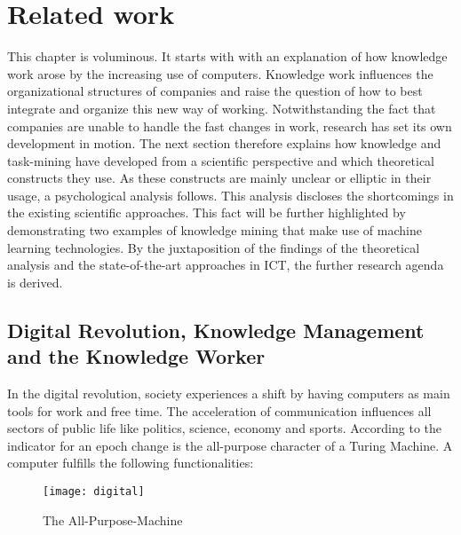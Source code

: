 
\chapter{Related work}
\label{relatedwork}
This chapter is voluminous. It starts with with an explanation of how knowledge work arose by the increasing use of computers. Knowledge work influences the organizational structures of companies and raise the question of how to best integrate and organize this new way of working. Notwithstanding the fact that companies are unable to handle the fast changes in work, research has set its own development in motion. The next section therefore explains how knowledge and task-mining have developed from a scientific perspective and which theoretical constructs they use. As these constructs are mainly unclear or elliptic in their usage, a psychological analysis follows. This analysis discloses the shortcomings in the existing scientific approaches. This fact will be further highlighted by demonstrating two examples of knowledge mining that make use of machine learning technologies. By the juxtaposition of the findings of the theoretical analysis and the state-of-the-art approaches in \ac{ICT}, the further research agenda is derived.

\section{Digital Revolution, Knowledge Management and the Knowledge Worker}
\label{knowledgemanagement}
In the digital revolution, society experiences a shift by having computers as main tools for work and free time. The acceleration of communication influences all sectors of public life like politics, science, economy and sports. According to \cite{buhl1997virtuelle} the indicator for an epoch change is the all-purpose character of a Turing Machine. A computer fulfills the following functionalities:

\begin{figure}[ht]
	\centering
  \texttt{[image: digital]}
	\caption{The All-Purpose-Machine}
	\label{fig1}
\end{figure}

